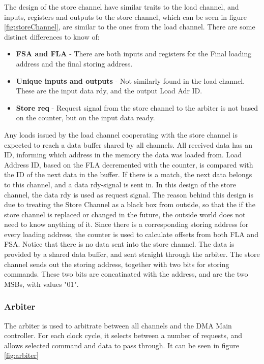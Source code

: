 The design of the store channel have similar traits to the load channel, and inputs, registers and outputs to the store channel, which can be seen in figure \ref{fig:storeChannel}, are similar to the ones from the load channel.
There are some distinct differences to know of:
\begin{itemize}
    \item \textbf{FSA and FLA} - There are both inputs and registers for the Final loading address and the final storing address.
    \item \textbf{Unique inputs and outputs} - Not similarly found in the load channel.
    These are the input data rdy, and the output Load Adr ID.
    \item \textbf{Store req} - Request signal from the store channel to the arbiter is not based on the counter, but on the input data ready.
\end{itemize}

Any loads issued by the load channel cooperating with the store channel is expected to reach a data buffer shared by all channels.
All received data has an ID, informing which address in the memory the data was loaded from.
Load Address ID, based on the FLA decremented with the counter, is compared with the ID of the next data in the buffer.
If there is a match, the next data belongs to this channel, and a data rdy-signal is sent in.
In this design of the store channel, the data rdy is used as request signal.
The reason behind this design is due to treating the Store Channel as a black box from outside, so that the if the store channel is replaced or changed in the future, the outside world does not need to know anything of it.
Since there is a corresponding storing address for every loading address, the counter is used to calculate offsets from both FLA and FSA.
Notice that there is no data sent into the store channel.
The data is provided by a shared data buffer, and sent straight through the arbiter.
The store channel sends out the storing address, together with two bits for storing commands.
These two bits are concatinated with the address, and are the two MSBs, with values "01".

\subsubsection{Arbiter}
The arbiter is used to arbitrate between all channels and the DMA Main controller.
For each clock cycle, it selects between a number of requests, and allows selected command and data to pass through.
It can be seen in figure \ref{fig:arbiter}

